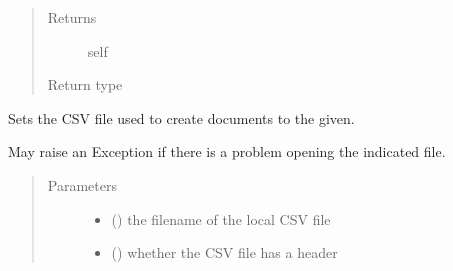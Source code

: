\documentclass[letterpaper,10pt,english]{sphinxmanual}
\begin{document}
\begin{fulllineitems}
\begin{fulllineitems}
\begin{quote}
\begin{description}
\begin{itemize}
\end{itemize}

\item[{Returns}] \leavevmode
self

\item[{Return type}] \leavevmode
{\hyperref[\detokenize{autoapi/pine/client/models/index:pine.client.models.CollectionBuilder}]{}}

\end{description}\end{quote}

\end{fulllineitems}


\begin{fulllineitems}
\label{\detokenize{autoapi/pine/client/models/index:pine.client.models.CollectionBuilder.document_csv_file}}
Sets the CSV file used to create documents to the given.

May raise an Exception if there is a problem opening the indicated file.
\begin{quote}\begin{description}
\item[{Parameters}] \leavevmode\begin{itemize}
\item {} 
 () \textendash{} the filename of the local CSV file

\item {} 
 () \textendash{} whether the CSV file has a header


\end{itemize}
\end{description}
\end{quote}
\end{fulllineitems}
\end{fulllineitems}
\end{document}
